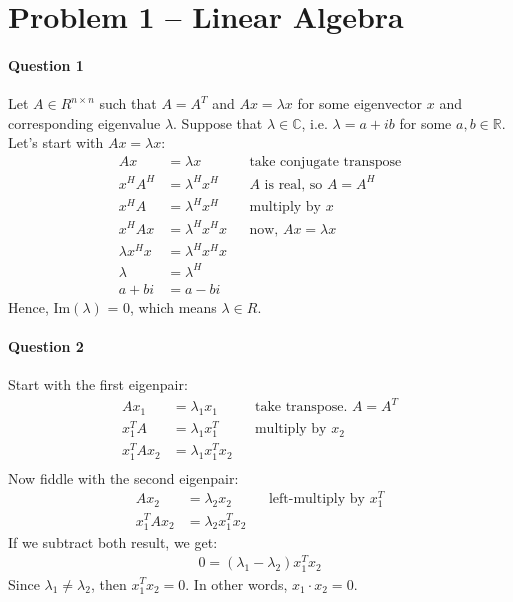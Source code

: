\section{Problem 1 – Linear Algebra}

\paragraph{Question 1}
Let $A\in R^{n\times n}$ such that $A = A^T$ and $Ax = \lambda x$ for some eigenvector $x$ and corresponding eigenvalue $\lambda$.
Suppose that $\lambda \in \mathbb{C}$, i.e. $\lambda = a + ib$ for some $a,b\in\mathbb{R}$.
Let's start with $Ax = \lambda x$:
\begin{align*}
    Ax &= \lambda x && \text{take conjugate transpose} \\
    x^H A^H &= \lambda^H x^H && \text{$A$ is real, so $A=A^H$} \\
    x^H A &= \lambda^H x^H && \text{multiply by  $x$} \\
    x^H A x &= \lambda^H x^H x && \text{now,  $Ax = \lambda x$} \\
    \lambda x^H x &= \lambda^H x^H x  \\
    \lambda &= \lambda^H \\
    a + bi &= a - bi
\end{align*}
Hence, Im$(\lambda)$ = 0, which means $\lambda \in R$.


\paragraph{Question 2}
Start with the first eigenpair:
\begin{align*}
    Ax_1 &= \lambda_1 x_1   && \text{take transpose. $A = A^T$} \\
    x_1^T A &= \lambda_1 x_1^T && \text{multiply by $x_2$} \\
     x_1^T A x_2 &= \lambda_1 x_1^T x_2 &&  \\
\end{align*}
Now fiddle with the second eigenpair:
\begin{align*}
    Ax_2 &= \lambda_2 x_2   && \text{left-multiply by $x_1^T$} \\
    x_1^T Ax_2 &= \lambda_2 x_1^T x_2 
\end{align*}
If we subtract both result, we get:
\begin{align*}
    0 = (\lambda_1 - \lambda_2) x_1^T x_2
\end{align*}
Since $\lambda_1 \neq \lambda_2$, then $ x_1^T x_2 = 0$.
In other words, $x_1 \cdot x_2 =0$.

